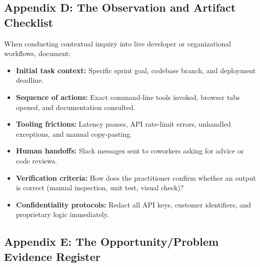 \subsection*{Appendix D: The Observation and Artifact Checklist}

When conducting contextual inquiry into live developer or organizational workflows, document:
\begin{itemize}[leftmargin=1.2em,itemsep=0.2ex]
  \item \textbf{Initial task context:} Specific sprint goal, codebase branch, and deployment deadline.
  \item \textbf{Sequence of actions:} Exact command-line tools invoked, browser tabs opened, and documentation consulted.
  \item \textbf{Tooling frictions:} Latency pauses, API rate-limit errors, unhandled exceptions, and manual copy-pasting.
  \item \textbf{Human handoffs:} Slack messages sent to coworkers asking for advice or code reviews.
  \item \textbf{Verification criteria:} How does the practitioner confirm whether an output is correct (manual inspection, unit test, visual check)?
  \item \textbf{Confidentiality protocols:} Redact all API keys, customer identifiers, and proprietary logic immediately.
\end{itemize}

\subsection*{Appendix E: The Opportunity/Problem Evidence Register}

